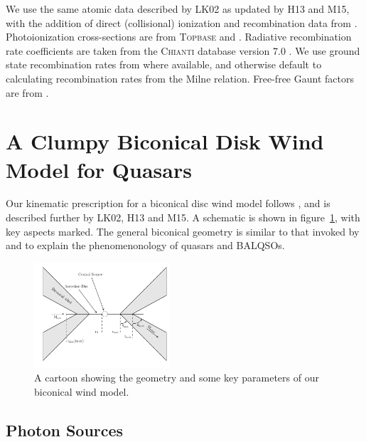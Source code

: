 \documentclass[useAMS,usenatbib]{mn2e_x}
\begin{document}
We use the same atomic data  described by LK02 as updated by H13 and M15, 
with the addition of direct (collisional) ionization and recombination
data from \cite{dere2007}. 
Photoionization cross-sections are from \textsc{Topbase} \citep{cunto1993} and \cite{vfky}.
Radiative recombination rate coefficients are taken from 
the \textsc{Chianti} database version 7.0 \citep{dere1997,landi2012}.
We use ground state recombination rates from \cite{badnell2006} where available,
and otherwise default to calculating recombination rates from the Milne
relation. Free-free Gaunt factors are from \cite{sutherland1998}.





%
%

\section{A Clumpy Biconical Disk Wind Model for Quasars}

Our kinematic prescription for a biconical disc wind model
follows \cite{SV93}, and is described further by
LK02, H13 and M15. A schematic is shown in figure~\ref{fig:cartoon},
with key aspects marked. The general biconical
geometry is similar to that invoked by \cite{MCGV95} and 
\cite{elvis2000} to explain the phenomenonology
of quasars and BALQSOs.

\begin{figure} 
\centering
\includegraphics[width=0.45\textwidth]{figures/fig2_cartoon.png}
\caption
{
A cartoon showing the geometry and some key parameters of
our biconical wind model.
}
\label{fig:cartoon}
\end{figure} 

\subsection{Photon Sources}
\label{sec:photon_sources}
\end{document}
